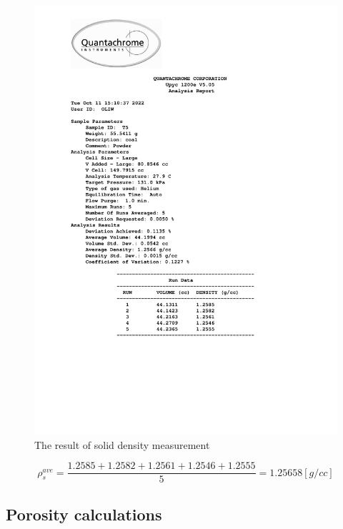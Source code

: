 \documentclass[a4paper,fleqn]{cas-dc}
\begin{document}
\begin{figure}[!h]
	\centering 
	\includegraphics[trim=2cm 6cm 4cm 0cm, clip,width=\columnwidth]{Sections/ultraReportT5.pdf}
	\caption{The result of solid density measurement}
	\label{fig:density_cal}
\end{figure}

{\footnotesize
	\begin{equation*}
		\rho_s^{ave} = \frac{1.2585+1.2582+1.2561+1.2546+1.2555}{5} = 1.25658 [g/cc]
	\end{equation*}
}

\subsection{Porosity calculations} \label{CH: Porosity}


%

%
\end{document}
